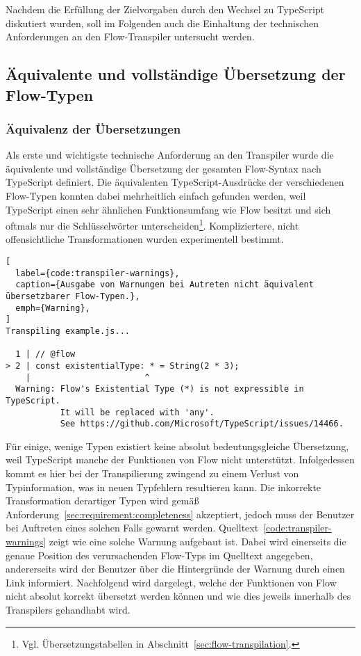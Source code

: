 Nachdem die Erfüllung der Zielvorgaben durch den Wechsel zu TypeScript diskutiert wurden, soll im Folgenden auch die Einhaltung der technischen Anforderungen an den Flow-Transpiler untersucht werden.

\subsection{Äquivalente und vollständige Übersetzung der Flow-Typen}
\label{sec:interpretation:equivalent-translation}

\subsubsection{Äquivalenz der Übersetzungen}

Als erste und wichtigste technische Anforderung an den Transpiler wurde die äquivalente und vollständige Übersetzung der gesamten Flow-Syntax nach TypeScript definiert. Die äquivalenten TypeScript-Ausdrücke der verschiedenen Flow-Typen konnten dabei mehrheitlich einfach gefunden werden, weil TypeScript einen sehr ähnlichen Funktionsumfang wie Flow besitzt und sich oftmals nur die Schlüsselwörter unterscheiden\footnote{Vgl. Übersetzungstabellen in Abschnitt~\ref{sec:flow-transpilation}.}. Kompliziertere, nicht offensichtliche Transformationen wurden experimentell bestimmt.

\begin{lstlisting}[
  label={code:transpiler-warnings},
  caption={Ausgabe von Warnungen bei Autreten nicht äquivalent übersetzbarer Flow-Typen.},
  emph={Warning},
]
Transpiling example.js...

  1 | // @flow
> 2 | const existentialType: * = String(2 * 3);
    |                       ^
  Warning: Flow's Existential Type (*) is not expressible in TypeScript.
           It will be replaced with 'any'.
           See https://github.com/Microsoft/TypeScript/issues/14466.
\end{lstlisting}

Für einige, wenige Typen existiert keine absolut bedeutungsgleiche Übersetzung, weil TypeScript manche der Funktionen von Flow nicht unterstützt. Infolgedessen kommt es hier bei der Transpilierung zwingend zu einem Verlust von Typinformation, was in neuen Typfehlern resultieren kann. Die inkorrekte Transformation derartiger Typen wird gemäß Anforderung~\ref{sec:requirement:completeness} akzeptiert, jedoch muss der Benutzer bei Auftreten eines solchen Falls gewarnt werden. Quelltext~\ref{code:transpiler-warnings} zeigt wie eine solche Warnung aufgebaut ist. Dabei wird einerseits die genaue Position des verursachenden Flow-Typs im Quelltext angegeben, andererseits wird der Benutzer über die Hintergründe der Warnung durch einen Link informiert. Nachfolgend wird dargelegt, welche der Funktionen von Flow nicht absolut korrekt übersetzt werden können und wie dies jeweils innerhalb des Transpilers gehandhabt wird.

